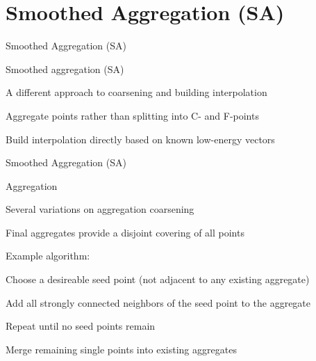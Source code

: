 \documentclass[18pt,xcolor=table]{beamer}
\begin{document}

\section{Smoothed Aggregation (SA)}

\begin{frame}{Smoothed Aggregation (SA)}
\begin{block}{Smoothed aggregation (SA)}
\bit
\item A different approach to coarsening and building interpolation
\item Aggregate points rather than splitting into C- and F-points
\item Build interpolation directly based on known low-energy vectors
\eit
\end{block}
\end{frame}

\begin{frame}{Smoothed Aggregation (SA)}
\begin{block}{Aggregation}
\bit
\item Several variations on aggregation coarsening 
\item Final aggregates provide a disjoint covering of all points
\item Example algorithm:
\bit
\item Choose a desireable seed point (not adjacent to any existing aggregate)
\item Add all strongly connected neighbors of the seed point to the aggregate
\item Repeat until no seed points remain
\item Merge remaining single points into existing aggregates
\eit
\eit
\end{block}
\end{frame}
\end{document}
